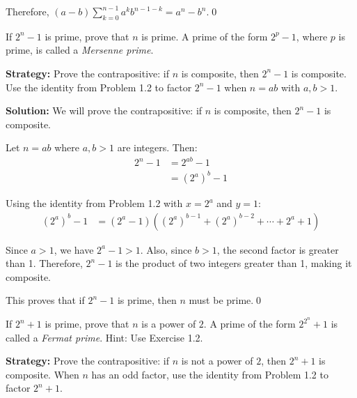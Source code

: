 Therefore, $(a - b)\sum_{k=0}^{n-1} a^k b^{n-1-k} = a^n - b^n$.\qed



\begin{problembox}
\begin{problemstatement}
If $2^n - 1$ is prime, prove that $n$ is prime. A prime of the form $2^p - 1$, where $p$ is prime, is called a \textit{Mersenne prime}.
\end{problemstatement}
\end{problembox}

\noindent\textbf{Strategy:} Prove the contrapositive: if $n$ is composite, then $2^n - 1$ is composite. Use the identity from Problem 1.2 to factor $2^n - 1$ when $n = ab$ with $a, b > 1$.

\bigskip\noindent\textbf{Solution:}
We will prove the contrapositive: if $n$ is composite, then $2^n - 1$ is composite.

Let $n = ab$ where $a, b > 1$ are integers. Then:
\begin{align*}
2^n - 1 &= 2^{ab} - 1 \\
&= (2^a)^b - 1
\end{align*}

Using the identity from Problem 1.2 with $x = 2^a$ and $y = 1$:
\begin{align*}
(2^a)^b - 1 &= (2^a - 1)((2^a)^{b-1} + (2^a)^{b-2} + \cdots + 2^a + 1)
\end{align*}

Since $a > 1$, we have $2^a - 1 > 1$. Also, since $b > 1$, the second factor is greater than 1. Therefore, $2^n - 1$ is the product of two integers greater than 1, making it composite.

This proves that if $2^n - 1$ is prime, then $n$ must be prime.\qed



\begin{problembox}
\begin{problemstatement}
If $2^n + 1$ is prime, prove that $n$ is a power of $2$. A prime of the form $2^{2^n} + 1$ is called a \textit{Fermat prime}. Hint: Use Exercise 1.2.
\end{problemstatement}
\end{problembox}

\noindent\textbf{Strategy:} Prove the contrapositive: if $n$ is not a power of $2$, then $2^n + 1$ is composite. When $n$ has an odd factor, use the identity from Problem 1.2 to factor $2^n + 1$.

